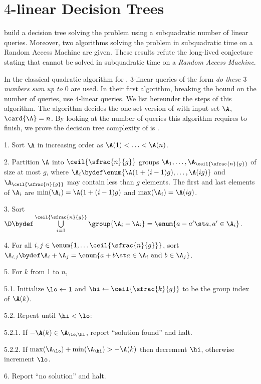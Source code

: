 \section{\(4\)-linear Decision Trees}

\citet*{gronlund:2014} build a decision tree
solving the \threeSUM problem using a subquadratic number of linear queries.
Moreover, two algorithms solving the \threeSUM problem in subquadratic time on
a Random Access Machine are
given.
These results refute the long-lived conjecture stating that \threeSUM
cannot be solved in subquadratic time on a \emph{Random Access Machine}.

In the classical quadratic algorithm for \threeSUM, $3$-linear queries of the
form \emph{do these $3$ numbers sum up to $0$} are used. In their first
algorithm, breaking the  bound on the number of queries,
\citeauthor{gronlund:2014} use $4$-linear queries.
We list hereunder the steps of this algorithm. The algorithm decides the one-set
version of \threeSUM with input set $\A$, $\card{\A} = n$. By looking at the
number of queries this algorithm requires to finish, we prove the
decision tree complexity of \threeSUM is .
\begin{algorithm}
\item[1.] Sort $\A$ in increasing order as $\A(1) < \ldots < \A(n)$.

\item[2.] Partition $\A$ into $\ceil{\sfrac{n}{g}}$ groups $\A_1, \ldots,
\A_{\ceil{\sfrac{n}{g}}}$ of size at most $g$, where $\A_i \bydef \enum{\A(1 + (i-1)g),
\ldots, \A(ig)}$ and $\A_{\ceil{\sfrac{n}{g}}}$ may contain less than $g$ elements.
The first and last elements of $\A_i$ are $\min(\A_i) = \A(1 + (i-1)g)$ and
$\max(\A_i) = \A(ig)$.

\item[3.] Sort $\D \bydef \bigcup\limits_{i = 1}^{\ceil{\sfrac{n}{g}}}
\group{\A_i-\A_i} = \enum{a - a' \st a, a' \in \A_i}$.

\item[4.] For all $i,j \in \enum{1, \ldots \ceil{\sfrac{n}{g}}}$, sort $\A_{i,j}
\bydef \A_i + \A_j = \enum{a + b \st a \in \A_i \text{ and } b \in \A_j}$.

\item[5.] For $k$ from 1 to $n$,

\item[5.1.] Initialize $\lo \gets 1$ and $\hi \gets \ceil{\sfrac{k}{g}}$ to be
the group index of $\A(k)$.

\item[5.2.] Repeat until $\hi < \lo$:

\item[5.2.1.] If $-\A(k) \in \A_{\lo,\hi}$, report ``solution found'' and halt.

\item[5.2.2.] If $\max(\A_{\lo}) + \min(\A_{\hi}) > -\A(k)$ then decrement
$\hi$, otherwise increment $\lo$.

\item[6.] Report ``no solution'' and halt.
\end{algorithm}

